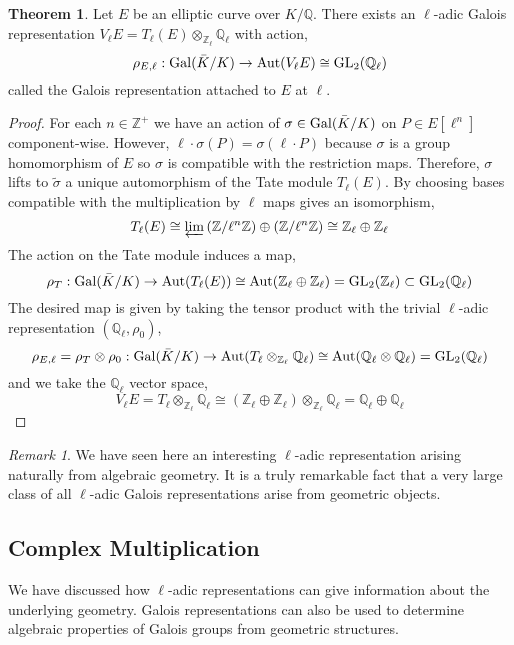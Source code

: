 \documentclass[12pt]{article}
\newcommand{\Z}{\mathbb{Z}}
\newcommand{\Q}{\mathbb{Q}}
\newcommand{\Gal}[1]{\mathrm{Gal} \small(#1 \small)}
\newcommand{\Aut}[1]{\mathrm{Aut} \small(#1 \small)}
\newcommand{\GL}[2]{\mathrm{GL}_{#1}(#2)}
\theoremstyle{remark}
\newtheorem*{remark}{Remark}
\theoremstyle{definition}
\newtheorem{theorem}{Theorem}[section]
\begin{document}
\begin{theorem} \label{thm:galois_rep_tate_module}
Let $E$ be an elliptic curve over $K / \Q$. There exists an $\ell$-adic Galois representation $V_{\ell} E = T_{\ell}(E) \otimes_{\Z_{\ell}} \Q_{\ell}$ with action,
\[ \rho_{E,\ell} : \Gal{\bar{K}/K} \to \Aut{V_{\ell}E} \cong \GL{2}{\Q_{\ell}} \]
called the Galois representation attached to $E$ at $\ell$.   
\end{theorem}

\begin{proof}
For each $n \in \Z^{+}$ we have an action of $\sigma \in \Gal{\bar{K} / K}$ on $P \in E[\ell^n]$ component-wise. However, $\ell \cdot \sigma(P) = \sigma(\ell \cdot P)$ because $\sigma$ is a group homomorphism of $E$ so $\sigma$ is compatible with the restriction maps. Therefore, $\sigma$ lifts to $\tilde{\sigma}$ a unique automorphism of the Tate module $T_{\ell}(E)$.
By choosing bases compatible with the multiplication by $\ell$ maps gives an isomorphism, 
\[ T_{\ell}(E) \cong \varprojlim{(\Z / \ell^n \Z) \oplus (\Z / \ell^n \Z)} \cong \Z_{\ell} \oplus \Z_{\ell} \]
The action on the Tate module induces a map,
\[\rho_T : \Gal{\bar{K}/K} \to \Aut{T_{\ell}(E)} \cong  \Aut{\Z_{\ell} \oplus \Z_{\ell}} = \GL{2}{\Z_{\ell}} \subset \GL{2}{\Q_{\ell}} \] 
The desired map is given by taking the tensor product with the trivial $\ell$-adic representation $(\Q_{\ell}, \rho_0)$,
\[ \rho_{E, \ell} = \rho_T \otimes \rho_0  : \Gal{\bar{K}/K} \to \Aut{T_{\ell} \otimes_{\Z_{\ell}} \Q_{\ell}} \cong \Aut{\Q_{\ell} \otimes \Q_{\ell}} = \GL{2}{\Q_{\ell}} \]
and we take the $\Q_{\ell}$ vector space,
\[V_{\ell} E = T_{\ell} \otimes_{\Z_{\ell}} \Q_{\ell} \cong (\Z_{\ell} \oplus \Z_{\ell}) \otimes_{\Z_{\ell}} \Q_{\ell} = \Q_{\ell} \oplus \Q_{\ell} \]
\end{proof}

\begin{remark}
We have seen here an interesting $\ell$-adic representation arising naturally from algebraic geometry. It is a truly remarkable fact that a very large class of all $\ell$-adic Galois representations arise from geometric objects. 
\end{remark}

\subsection{Complex Multiplication}

We have discussed how $\ell$-adic representations can give information about the underlying geometry. Galois representations can also be used to determine algebraic properties of Galois groups from geometric structures.
\end{document}
